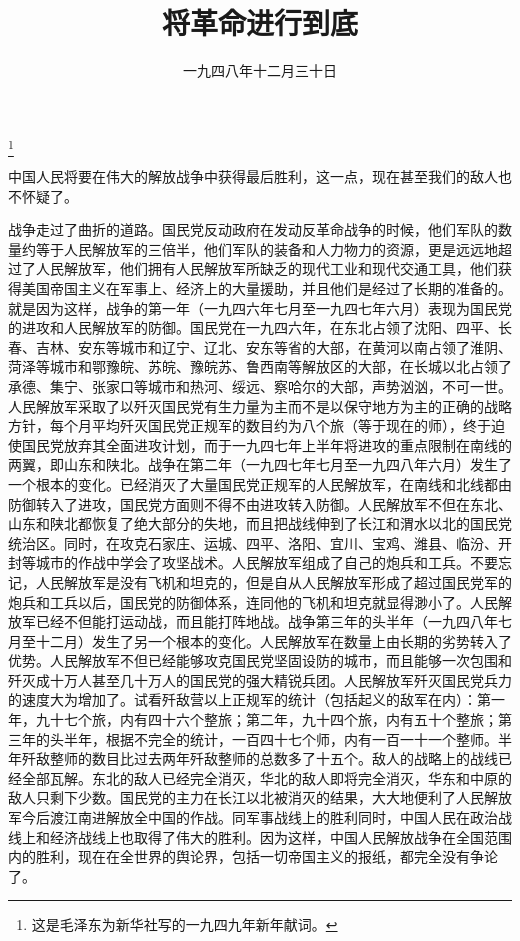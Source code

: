 
\title{将革命进行到底}
\date{一九四八年十二月三十日}
\thanks{这是毛泽东为新华社写的一九四九年新年献词。}
\maketitle


中国人民将要在伟大的解放战争中获得最后胜利，这一点，现在甚至我们的敌人也不怀疑了。

战争走过了曲折的道路。国民党反动政府在发动反革命战争的时候，他们军队的数量约等于人民解放军的三倍半，他们军队的装备和人力物力的资源，更是远远地超过了人民解放军，他们拥有人民解放军所缺乏的现代工业和现代交通工具，他们获得美国帝国主义在军事上、经济上的大量援助，并且他们是经过了长期的准备的。就是因为这样，战争的第一年（一九四六年七月至一九四七年六月）表现为国民党的进攻和人民解放军的防御。国民党在一九四六年，在东北占领了沈阳、四平、长春、吉林、安东等城市和辽宁、辽北、安东等省的大部，在黄河以南占领了淮阴、菏泽等城市和鄂豫皖、苏皖、豫皖苏、鲁西南等解放区的大部，在长城以北占领了承德、集宁、张家口等城市和热河、绥远、察哈尔的大部，声势汹汹，不可一世。人民解放军采取了以歼灭国民党有生力量为主而不是以保守地方为主的正确的战略方针，每个月平均歼灭国民党正规军的数目约为八个旅（等于现在的师），终于迫使国民党放弃其全面进攻计划，而于一九四七年上半年将进攻的重点限制在南线的两翼，即山东和陕北。战争在第二年（一九四七年七月至一九四八年六月）发生了一个根本的变化。已经消灭了大量国民党正规军的人民解放军，在南线和北线都由防御转入了进攻，国民党方面则不得不由进攻转入防御。人民解放军不但在东北、山东和陕北都恢复了绝大部分的失地，而且把战线伸到了长江和渭水以北的国民党统治区。同时，在攻克石家庄、运城、四平、洛阳、宜川、宝鸡、潍县、临汾、开封等城市的作战中学会了攻坚战术。人民解放军组成了自己的炮兵和工兵。不要忘记，人民解放军是没有飞机和坦克的，但是自从人民解放军形成了超过国民党军的炮兵和工兵以后，国民党的防御体系，连同他的飞机和坦克就显得渺小了。人民解放军已经不但能打运动战，而且能打阵地战。战争第三年的头半年（一九四八年七月至十二月）发生了另一个根本的变化。人民解放军在数量上由长期的劣势转入了优势。人民解放军不但已经能够攻克国民党坚固设防的城市，而且能够一次包围和歼灭成十万人甚至几十万人的国民党的强大精锐兵团。人民解放军歼灭国民党兵力的速度大为增加了。试看歼敌营以上正规军的统计（包括起义的敌军在内）：第一年，九十七个旅，内有四十六个整旅；第二年，九十四个旅，内有五十个整旅；第三年的头半年，根据不完全的统计，一百四十七个师，内有一百一十一个整师。半年歼敌整师的数目比过去两年歼敌整师的总数多了十五个。敌人的战略上的战线已经全部瓦解。东北的敌人已经完全消灭，华北的敌人即将完全消灭，华东和中原的敌人只剩下少数。国民党的主力在长江以北被消灭的结果，大大地便利了人民解放军今后渡江南进解放全中国的作战。同军事战线上的胜利同时，中国人民在政治战线上和经济战线上也取得了伟大的胜利。因为这样，中国人民解放战争在全国范围内的胜利，现在在全世界的舆论界，包括一切帝国主义的报纸，都完全没有争论了。

